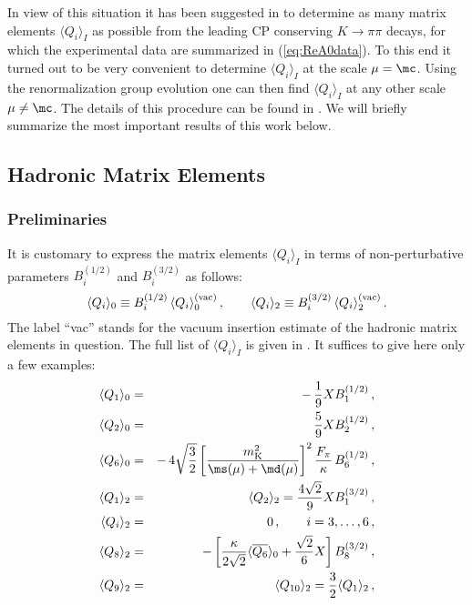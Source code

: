 In view of this situation it has been suggested in \cite{BJLW} to
determine as many matrix elements $\langle Q_i \rangle_I$ as possible
from the leading CP conserving $K \to \pi\pi$ decays, for which the
experimental data are summarized in (\ref{eq:ReA0data}). To this end it
turned out to be very convenient to determine $\langle Q_i \rangle_I$
at the scale $\mu = \mc$.  Using the renormalization group evolution one
can then find $\langle Q_i \rangle_I$ at any other scale $\mu \not=
\mc$. The details of this procedure can be found in
\cite{BJLW}. We will briefly summarize the most important results of this
work below.

\subsection{Hadronic Matrix Elements}
\subsubsection{Preliminaries}
It is customary to express the matrix elements
$\langle Q_i \rangle_I$ in terms of non-perturbative parameters
$B_i^{(1/2)}$ and $B_i^{(3/2)}$ as follows:
\begin{equation}
\langle Q_i \rangle_0 \equiv B_i^{(1/2)} \, \langle Q_i
\rangle_0^{\rm (vac)}\,,
\qquad
\langle Q_i\rangle_2 \equiv B_i^{(3/2)} \, \langle Q_i
\rangle_2^{\rm (vac)} \,.
\label{eq:1}
\end{equation}
The label ``vac'' stands for the vacuum
insertion estimate of the hadronic matrix elements in question. 
The full list of $\langle Q_i\rangle_I$ is given in \cite{BJLW}.
 It suffices to give here only a few examples:
\begin{eqnarray}
\langle Q_1 \rangle_0 &=& -\,\frac{1}{9} X B_1^{(1/2)} \, ,
\label{eq:Q10} \\
\langle Q_2 \rangle_0 &=&  \frac{5}{9} X B_2^{(1/2)} \, ,
\label{eq:Q20} \\
\langle Q_6 \rangle_0 &=&  -\,4 \sqrt{\frac{3}{2}} 
\left[ \frac{m_{\rm K}^2}{\ms(\mu) + \md(\mu)}\right]^2
\frac{F_\pi}{\kappa} \,B_6^{(1/2)} \, ,
\label{eq:Q60}\\ 
\langle Q_1 \rangle_2 &=& 
\langle Q_2 \rangle_2 = \frac{4 \sqrt{2}}{9} X B_1^{(3/2)} \, ,
\label{eq:Q122} \\
\langle Q_i \rangle_2 &=&  0 \, , \qquad i=3,\ldots,6 \, ,
\label{eq:Q362} \\
\langle Q_8 \rangle_2 &=& 
  -\left[ \frac{\kappa}{2 \sqrt{2}} \langle \overline{Q_6} \rangle_0
          + \frac{\sqrt{2}}{6} X
   \right] B_8^{(3/2)} \, ,
\label{eq:Q82} \\
\langle Q_9 \rangle_2 &=& 
   \langle Q_{10} \rangle_2 = \frac{3}{2} \langle Q_1 \rangle_2 \, ,
\label{eq:Q9102}
\end{eqnarray}
